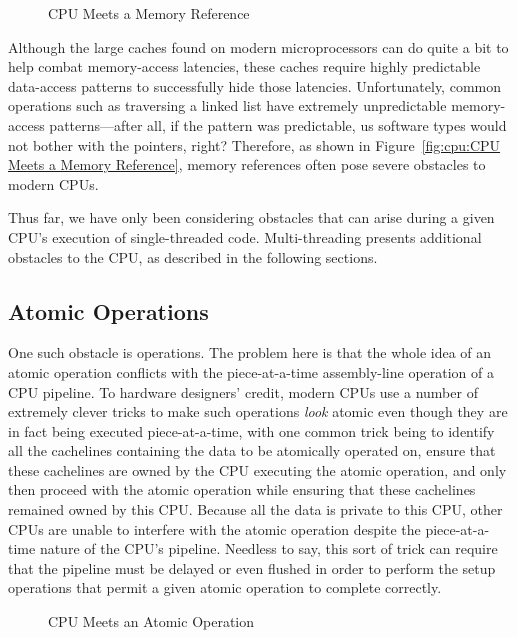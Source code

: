 \begin{figure}
\centering
{}
\caption{CPU Meets a Memory Reference}
\end{figure}

Although the large caches found on modern microprocessors can do quite
a bit to help combat memory-access latencies,
these caches require highly predictable data-access patterns to
successfully hide those latencies.
Unfortunately, common operations such as traversing a linked list
have extremely unpredictable memory-access patterns---after all,
if the pattern was predictable, us software types would not bother
with the pointers, right?
Therefore, as shown in
Figure~\ref{fig:cpu:CPU Meets a Memory Reference},
memory references often pose severe obstacles to modern CPUs.

Thus far, we have only been considering obstacles that can arise during
a given CPU's execution of single-threaded code.
Multi-threading presents additional obstacles to the CPU, as
described in the following sections.

\subsection{Atomic Operations}
\label{sec:cpu:Atomic Operations}

One such obstacle is  operations.
The problem here is that the whole idea of an atomic operation conflicts with
the piece-at-a-time assembly-line operation of a CPU pipeline.
To hardware designers' credit, modern CPUs use a number of extremely clever
tricks to make such operations \emph{look} atomic even though they
are in fact being executed piece-at-a-time,
with one common trick being to identify all the cachelines containing the
data to be atomically operated on,
ensure that these cachelines are owned by the CPU executing the
atomic operation, and only then proceed with the atomic operation
while ensuring that these cachelines remained owned by this CPU\@.
Because all the data is private to this CPU, other CPUs are unable to
interfere with the atomic operation despite the piece-at-a-time nature
of the CPU's pipeline.
Needless to say, this sort of trick can require that
the pipeline must be delayed or even flushed in order to
perform the setup operations that
permit a given atomic operation to complete correctly.

\begin{figure}
\centering
{}
\caption{CPU Meets an Atomic Operation}
\end{figure}

